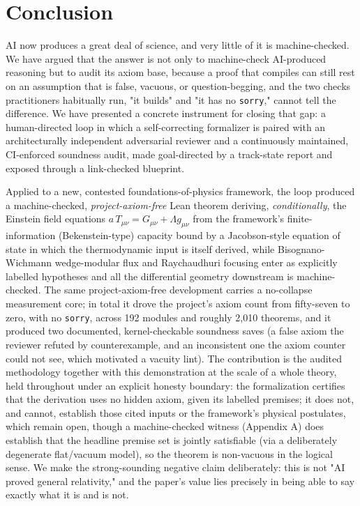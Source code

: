 \documentclass[11pt]{article}
\begin{document}
\section{Conclusion}

AI now produces a great deal of science, and very little of it is machine-checked. We have argued
that the answer is not only to machine-check AI-produced reasoning but to audit its axiom base,
because a proof that compiles can still rest on an assumption that is false, vacuous, or
question-begging, and the two checks practitioners habitually run, "it builds" and "it has no
\texttt{sorry}," cannot tell the difference. We have presented a concrete instrument for closing that gap: a
human-directed loop in which a self-correcting formalizer is paired with an architecturally
independent adversarial reviewer and a continuously maintained, CI-enforced soundness audit, made
goal-directed by a track-state report and exposed through a link-checked blueprint.

Applied to a new, contested foundations-of-physics framework, the loop produced a machine-checked,
\emph{project-axiom-free} Lean theorem deriving, \emph{conditionally}, the Einstein field equations
$a\,T_{\mu\nu}=G_{\mu\nu}+\Lambda g_{\mu\nu}$ from the framework's finite-information
(Bekenstein-type) capacity bound by a Jacobson-style equation of state in which the thermodynamic
input is itself derived, while Bisognano-Wichmann wedge-modular flux and Raychaudhuri focusing enter
as explicitly labelled hypotheses and all the differential geometry downstream is machine-checked.
The same project-axiom-free development carries a no-collapse measurement core; in total it
drove the project's axiom count from fifty-seven to zero, with no \texttt{sorry}, across 192 modules
and roughly 2,010 theorems, and it produced two documented, kernel-checkable soundness saves (a false
axiom the reviewer refuted by counterexample, and an inconsistent one the axiom counter could not see,
which motivated a vacuity lint). The contribution is the audited methodology together with this
demonstration at the scale of a whole theory, held throughout under an explicit honesty boundary: the
formalization certifies that the derivation uses no hidden axiom, given its labelled premises; it
does not, and cannot, establish those cited inputs or the framework's physical postulates, which
remain open, though a machine-checked witness (Appendix A) does establish that the headline premise
set is jointly satisfiable (via a deliberately degenerate flat/vacuum model), so the theorem is
non-vacuous in the logical sense. We make the strong-sounding negative claim deliberately: this is
not "AI proved general relativity," and the paper's value lies precisely in being able to say exactly
what it is and is not.
\end{document}
